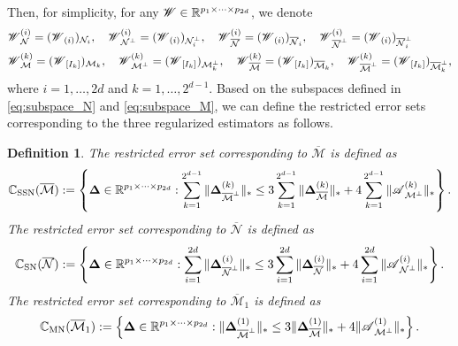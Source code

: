 \documentclass[12pt]{article}
\newtheorem{definition}{Definition}
\newcommand{\bm}{\boldsymbol}
\newcommand{\cm}[1]{\mbox{\boldmath$\mathscr{#1}$}}
\begin{document}
Then, for simplicity, for any $\cm{W}\in\mathbb{R}^{p_1\times\cdots\times p_{2d}}$, we denote
\begin{equation}\begin{split}
&\cm{W}_{\mathcal{N}}^{(i)}=(\cm{W}_{(i)})_{\mathcal{N}_i},\quad \cm{W}_{\mathcal{N}^\perp}^{(i)}=(\cm{W}_{(i)})_{\mathcal{N}_i^\perp}, \quad
\cm{W}_{\overline{\mathcal{N}}}^{(i)}=(\cm{W}_{(i)})_{\overline{\mathcal{N}}_i}, \quad
\cm{W}_{\overline{\mathcal{N}}^\perp}^{(i)}=(\cm{W}_{(i)})_{\overline{\mathcal{N}}_i^\perp}\\
&\cm{W}_{\mathcal{M}}^{(k)}=(\cm{W}_{[I_k]})_{\mathcal{M}_k}, \quad \cm{W}_{\mathcal{M}^\perp}^{(k)}=(\cm{W}_{[I_k]})_{\mathcal{M}_k^\perp}, \quad
\cm{W}_{\overline{\mathcal{M}}}^{(k)}=(\cm{W}_{[I_k]})_{\overline{\mathcal{M}}_k}, \quad
\cm{W}_{\overline{\mathcal{M}}^\perp}^{(k)}=(\cm{W}_{[I_k]})_{\overline{\mathcal{M}}_k^\perp},
\end{split}\end{equation}
where $i=1,\dots,2d$ and $k=1,\dots,2^{d-1}$. Based on the subspaces defined in \eqref{eq:subspace_N} and \eqref{eq:subspace_M}, we can define the  restricted error sets corresponding to the three regularized estimators as follows.


%






\begin{definition}
	The restricted error set corresponding to $\overline{\mathcal{M}}$ is defined as
	\begin{equation}
	\mathbb{C}_{\textup{SSN}}(\overline{\mathcal{M}}):=\left\{\bm{\Delta}\in\mathbb{R}^{p_1\times\cdots\times p_{2d}}:\sum_{k=1}^{2^{d-1}}\|\bm{\Delta}_{\overline{\mathcal{M}}^\perp}^{(k)}\|_{*}\leq
	3\sum_{k=1}^{2^{d-1}}\|\bm{\Delta}^{(k)}_{\overline{\mathcal{M}}}\|_{*}+4\sum_{k=1}^{2^{d-1}}\|\cm{A}^{(k)}_{\mathcal{M}^\perp}\|_{*}\right\}.
	\end{equation}
	The restricted error set corresponding to $\overline{\mathcal{N}}$ is defined as
	\begin{equation}
	\mathbb{C}_{\textup{SN}}(\overline{\mathcal{N}}):=\left\{\bm{\Delta}\in\mathbb{R}^{p_1\times\cdots\times p_{2d}}:\sum_{i=1}^{2d}\|\bm{\Delta}_{\overline{\mathcal{N}}^\perp}^{(i)}\|_{*}\leq
	3\sum_{i=1}^{2d}\|\bm{\Delta}^{(i)}_{\overline{\mathcal{N}}}\|_{*}+4\sum_{i=1}^{2d}\|\cm{A}^{(i)}_{\mathcal{N}^\perp}\|_{*}\right\}.
	\end{equation}
	The restricted error set corresponding to $\overline{\mathcal{M}}_1$ is defined as
	\begin{equation}
	\mathbb{C}_{\textup{MN}}(\overline{\mathcal{M}}_1):=\left\{\bm{\Delta}\in\mathbb{R}^{p_1\times\cdots\times p_{2d}}:\|\bm{\Delta}_{\overline{\mathcal{M}}^\perp}^{(1)}\|_{*}\leq
	3\|\bm{\Delta}^{(1)}_{\overline{\mathcal{M}}}\|_{*}+4\|\cm{A}^{(1)}_{\mathcal{M}^\perp}\|_{*}\right\}.
	\end{equation}
\end{definition}
\end{document}
